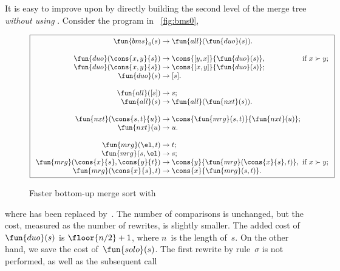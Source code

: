 It is easy to improve upon  by directly building the second
level of the merge tree \emph{without using
  }. Consider the program in
\fig~\vref{fig:bms0},
\begin{figure}
\begin{equation*}
\boxed{%
\begin{array}{r@{\;}l@{\;}l@{\;}l}
\fun{bms}_0(s)   & \rightarrow & \fun{all}(\fun{duo}(s)).\\
\\
\fun{duo}(\cons{x,y}{s}) & \rightarrow & \cons{[y,x]}{\fun{duo}(s)},
                                       & \text{if \(x \succ y\)};\\
\fun{duo}(\cons{x,y}{s}) & \rightarrow & \cons{[x,y]}{\fun{duo}(s)};\\
\fun{duo}(s)             & \rightarrow & [s].\\
\\
\fun{all}([s]) & \rightarrow & s;\\
\fun{all}(s)   & \rightarrow & \fun{all}(\fun{nxt}(s)).\\
\\
\fun{nxt}(\cons{s,t}{u}) & \rightarrow
                         & \cons{\fun{mrg}(s,t)}{\fun{nxt}(u)};\\
\fun{nxt}(u)             & \rightarrow & u.\\
\\
\fun{mrg}(\el,t)         & \rightarrow & t;\\
\fun{mrg}(s,\el)         & \rightarrow & s;\\
\fun{mrg}(\cons{x}{s},\cons{y}{t}) & \rightarrow
                         & \cons{y}{\fun{mrg}(\cons{x}{s},t)},
                         & \text{if \(x \succ y\)};\\
\fun{mrg}(\cons{x}{s},t) & \rightarrow & \cons{x}{\fun{mrg}(s,t)}.
\end{array}}
\end{equation*}
\caption{Faster bottom\hyp{}up merge sort with }
\label{fig:bms0}
\end{figure}
where  has been replaced
by~. The number of comparisons is
unchanged, but the cost, measured as the number of rewrites, is
slightly smaller. The added cost
of~\(\fun{duo}(s)\) is \(\floor{n/2}+1\), where
\(n\)~is the length of~\(s\). On the other hand, we save the cost
of~\(\fun{solo}(s)\). The first rewrite by
rule~\(\sigma\) is not performed, as well as the subsequent call

